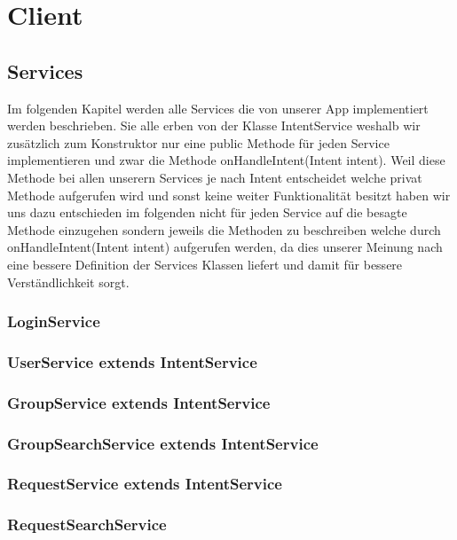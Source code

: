 
\section{Client} 
	\subsection{Services}
	Im folgenden Kapitel werden alle Services die von unserer App implementiert werden beschrieben.
	Sie alle erben von der Klasse IntentService weshalb wir zusätzlich zum Konstruktor nur eine public Methode für jeden Service implementieren und zwar die Methode onHandleIntent(Intent intent).
	Weil diese Methode bei allen unserern Services je nach Intent entscheidet welche privat Methode aufgerufen wird und sonst keine weiter Funktionalität besitzt haben wir uns dazu entschieden im folgenden nicht für jeden Service auf die besagte Methode einzugehen sondern jeweils die Methoden zu beschreiben welche durch onHandleIntent(Intent intent) aufgerufen werden, da dies unserer Meinung nach eine bessere Definition der Services Klassen liefert und damit für bessere Verständlichkeit sorgt. 
	\subsubsection {LoginService}

	\subsubsection {UserService extends IntentService}
	\subsubsection {GroupService extends IntentService}
	\subsubsection {GroupSearchService extends IntentService}
	\subsubsection {RequestService extends IntentService}
	\subsubsection {RequestSearchService}
